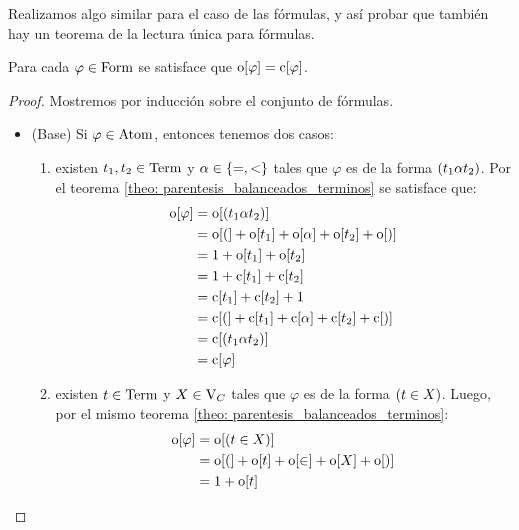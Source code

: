 \begin{agregado}
Realizamos algo similar para el caso de las fórmulas, y así probar que también hay un teorema de la lectura única para fórmulas.

\begin{theorem}
	\label{theo: parentesis_balanceados_formulas}
	Para cada $\varphi\in\FORMULAS$ se satisface que $\ABIERTO\bra*{\varphi} =\CERRADO\bra*{\varphi}$.
\end{theorem}

\begin{proof}
	Mostremos por inducción sobre el conjunto de fórmulas.
	\begin{itemize}
		\item (Base) Si $\varphi\in\ATOMICAS$, entonces tenemos dos casos:
		\begin{enumerate}
			\item existen $t_{1}, t_{2}\in\TERMINOS$ y $\alpha\in\set*{=, <}$ tales que $\varphi$ es de la forma $\pa*{t_{1}\alpha t_{2}}$. Por el teorema \ref{theo: parentesis_balanceados_terminos} se satisface que:
			\begin{align*}
				\ABIERTO\bra*{\varphi} &=\ABIERTO\bra*{\pa*{t_{1}\alpha t_{2}}}\\
				&=\ABIERTO\bra*{(} +\ABIERTO\bra*{t_{1}} +\ABIERTO\bra*{\alpha} +\ABIERTO\bra*{t_{2}} +\ABIERTO\bra*{)}\\
				&= 1 +\ABIERTO\bra*{t_{1}} +\ABIERTO\bra*{t_{2}}\\
				&= 1 +\CERRADO\bra*{t_{1}} +\CERRADO\bra*{t_{2}}\\
				&=\CERRADO\bra*{t_{1}} +\CERRADO\bra*{t_{2}} + 1\\
				&=\CERRADO\bra*{(} +\CERRADO\bra*{t_{1}} +\CERRADO\bra*{\alpha} +\CERRADO\bra*{t_{2}} +\CERRADO\bra*{)}\\
				&=\CERRADO\bra*{\pa*{t_{1}\alpha t_{2}}}\\
				&=\CERRADO\bra*{\varphi}
			\end{align*}
			\item existen $t\in\TERMINOS$ y $X\in\VARIABLES[C]$ tales que $\varphi$ es de la forma $\pa*{t\in X}$. Luego, por el mismo teorema \ref{theo: parentesis_balanceados_terminos}:
			\begin{align*}
				\ABIERTO\bra*{\varphi} &=\ABIERTO\bra*{\pa*{t\in X}}\\
				&=\ABIERTO\bra*{(} +\ABIERTO\bra*{t} +\ABIERTO\bra*{\in} +\ABIERTO\bra*{X} +\ABIERTO\bra*{)}\\
				&= 1 +\ABIERTO\bra*{t}\\

\end{align*}
\end{enumerate}
\end{itemize}
\end{proof}
\end{agregado}
